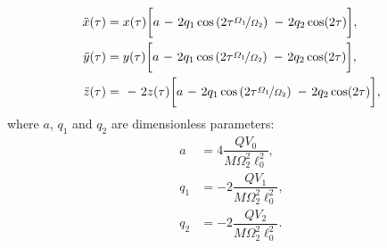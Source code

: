 \begin{subequations}
\label{eq of motion for simulation}
\begin{align}
	\ddot{x}(\tau) & = x(\tau) \bigg[ a \minus 2 q_1 \cos\left(2 \tau \nicefrac{\Omega_1}{\Omega_2} \right) \minus 2 q_2 \cos(2\tau) \bigg], \\
	\ddot{y}(\tau) & = y(\tau) \bigg[ a \minus 2 q_1 \cos\left(2 \tau \nicefrac{\Omega_1}{\Omega_2} \right) \minus 2 q_2 \cos(2\tau) \bigg], \\
	\label{studied eq of motion}
	\ddot{z}(\tau) & = \minus 2z(\tau) \bigg[ a \minus 2 q_1 \cos\left(2 \tau \nicefrac{\Omega_1}{\Omega_2} \right) \minus 2 q_2 \cos(2\tau) \bigg],
\end{align}
\end{subequations}
where $a$, $q_1$ and $q_2$ are dimensionless parameters:
\begin{subequations}
\begin{align}
	\label{a}
	a & = 4 \dfrac{Q V_0}{M\Omega_2^2 \ell_0^2}, \\
	\label{q_1}
	q_1 & = \minus 2 \dfrac{Q V_1}{M\Omega_2^2 \ell_0^2}, \\
	\label{q_2}
	q_2 & = \minus 2 \dfrac{Q V_2}{M\Omega_2^2 \ell_0^2}.
\end{align}
\end{subequations}


